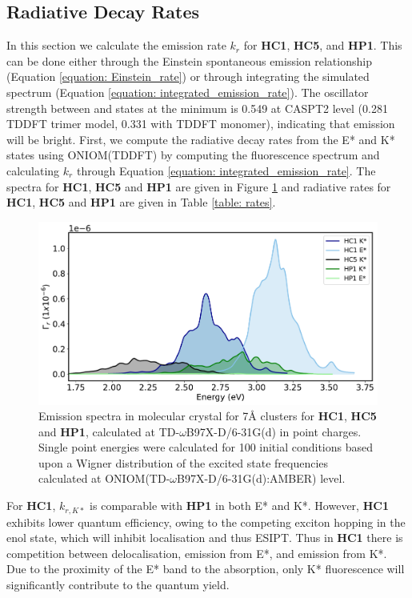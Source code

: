 \subsection{Radiative Decay Rates}\label{section: connecting_radiative_rates}
In this section we calculate the emission rate $k_{r}$ for \textbf{HC1}, \textbf{HC5}, and \textbf{HP1}. This can be done either through the Einstein spontaneous emission relationship (Equation \ref{equation: Einstein_rate}) or through integrating the simulated spectrum (Equation \ref{equation: integrated_emission_rate}). The oscillator strength between \sone{} and \szero{} states at the \Kstar{} minimum is 0.549 at CASPT2 level (0.281 TDDFT trimer model, 0.331 with TDDFT monomer), indicating that emission will be bright. First, we compute the radiative decay rates from the E* and K* states using ONIOM(TDDFT) by computing the fluorescence spectrum and calculating $k_{r}$ through Equation \ref{equation: integrated_emission_rate}. The spectra for \textbf{HC1}, \textbf{HC5} and \textbf{HP1} are given in Figure \ref{figure: HC1_HC5_HP1_emission_oniom} and radiative rates for \textbf{HC1}, \textbf{HC5} and \textbf{HP1} are given in Table \ref{table: rates}.

\begin{figure}[t]
\centering
\includegraphics[width=0.8\linewidth]{5ConnectingCrystalStructure/HC1_HC5_HP1_emission_oniom}
\caption[Emission spectra in molecular crystal for 7\AA{} clusters for \textbf{HC1}, \textbf{HC5} and \textbf{HP1}]{Emission spectra in molecular crystal for 7\AA{} clusters for \textbf{HC1}, \textbf{HC5} and \textbf{HP1}, calculated at TD-$\omega$B97X-D/6-31G(d) in point charges. Single point energies were calculated for 100 initial conditions based upon a Wigner distribution of the excited state frequencies calculated at ONIOM(TD-$\omega$B97X-D/6-31G(d):AMBER) level.}
\label{figure: HC1_HC5_HP1_emission_oniom}
\end{figure}

For \textbf{HC1}, $k_{r,K*}$ is comparable with \textbf{HP1} in both E* and K*. However, \textbf{HC1} exhibits lower quantum efficiency, owing to the competing exciton hopping in the enol state, which will inhibit localisation and thus ESIPT. Thus in \textbf{HC1} there is competition between delocalisation, emission from E*, and emission from K*. Due to the proximity of the E* band to the absorption, only K* fluorescence will significantly contribute to the quantum yield.

